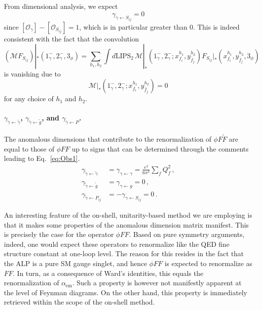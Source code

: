 From dimensional analysis, we expect
\begin{equation}
    \gamma_{\gamma\leftarrow S_{ij}}=0
\end{equation}
since $[\mathcal O_\gamma]-[\mathcal O_{S_{ij}}]=1$, which is in particular greater than $0$.
This is indeed consistent with the fact that the convolution
\begin{equation}
    (\mathcal M F_{S_{ij}})|_*(1^-_\gamma,2^-_\gamma,3_\phi) = \sum_{h_1,h_2}\int d\text{LIPS}_2\, \mathcal M|_*(1^-_\gamma,2^-_\gamma;x_{f_i}^{h_1},y^{h_2}_{\bar f_j})F_{S_{ij}}|_*(x_{f_i}^{h_1},y^{h_2}_{\bar f_j},3_\phi)
\end{equation}
is vanishing due to
\begin{equation}
    \mathcal M|_*(1^-_\gamma,2^-_\gamma;x_{f_i}^{h_1},y^{h_2}_{\bar f_j})=0
\end{equation}
for any choice of $h_1$ and $h_2$.

\paragraph{$\gamma_{\tilde\gamma \leftarrow \tilde\gamma}$, $\gamma_{\tilde\gamma \leftarrow \tilde g}$, and $\gamma_{\tilde\gamma \leftarrow P}$.}
\label{par:PhiFF}
The anomalous dimensions that contribute to the renormalization of $\phi F\tilde F$ are equal to those of $\phi FF$ up to signs that can be determined through the comments leading to Eq.~\eqref{eq:Obs1}.
\begin{align}
    \gamma_{\tilde\gamma \leftarrow \tilde\gamma} &= \gamma_{\gamma \leftarrow \gamma} = \frac{e^2}{6\pi^2}\sum_f Q_f^2 \,,\\
    \gamma_{\tilde\gamma \leftarrow \tilde g} &= \gamma_{\gamma \leftarrow  g} = 0\,,\\
    \gamma_{\tilde\gamma \leftarrow P_{ij}} &= -\gamma_{\gamma \leftarrow S_{ij}} = 0\,.
\end{align}

An interesting feature of the on-shell, unitarity-based method we are employing is that it makes some properties of the anomalous dimension matrix manifest. This is precisely the case for the operator $\phi FF$. Based on pure symmetry arguments, indeed, 
one would expect these operators to renormalize like the QED fine structure constant at one-loop level. The reason for this resides in the fact that the ALP is a pure SM gauge singlet, and hence $\phi FF$ is expected to renormalize as $FF$. In turn, as a consequence of Ward's identities, this equals the renormalization of $\alpha_{\text{em}}$. Such a property is however not manifestly apparent at the level of Feynman diagrams.
On the other hand, this property is immediately retrieved within the scope of the on-shell method.


